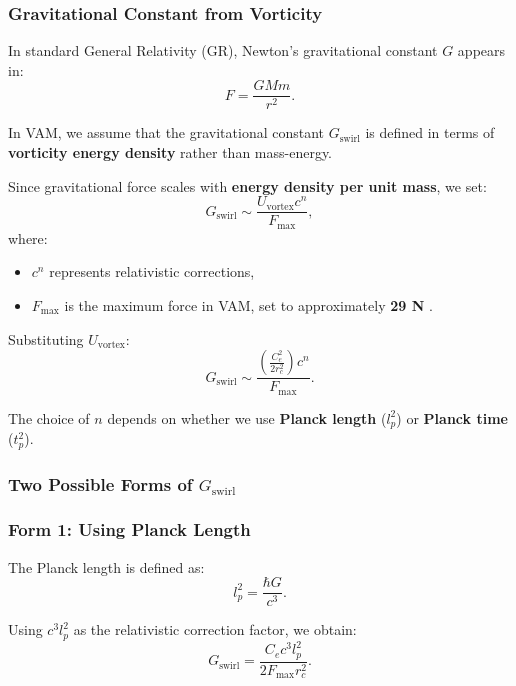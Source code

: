 \subsubsection*{Gravitational Constant from Vorticity}
In standard General Relativity (GR), Newton’s gravitational constant \( G \) appears in:
\begin{equation*}
    F = \frac{GMm}{r^2}.
\end{equation*}

In VAM, we assume that the gravitational constant \(  G_\text{swirl} \) is defined in terms of \textbf{vorticity energy density} rather than mass-energy.

Since gravitational force scales with \textbf{energy density per unit mass}, we set:
\begin{equation*}
     G_\text{swirl} \sim \frac{U_{\text{vortex}} c^n}{F_{\max}},
\end{equation*}
where:
\begin{itemize}
    \item \( c^n \) represents relativistic corrections,
    \item \( F_{\max} \) is the maximum force in VAM, set to approximately \textbf{29 N} \cite{schiller_max_force}.
\end{itemize}

Substituting \( U_{\text{vortex}} \):
\begin{equation*}
     G_\text{swirl} \sim \frac{\left( \frac{C_e^2}{2 r_c^2} \right) c^n}{F_{\max}}.
\end{equation*}

The choice of \( n \) depends on whether we use \textbf{Planck length} (\( l_p^2 \)) or \textbf{Planck time} (\( t_p^2 \)).

\subsubsection*{Two Possible Forms of \(  G_\text{swirl} \)}
\subsubsection*{Form 1: Using Planck Length}
The Planck length is defined as:
\begin{equation*}
    l_p^2 = \frac{\hbar G}{c^3}.
\end{equation*}

Using \( c^3 l_p^2 \) as the relativistic correction factor, we obtain:
\begin{equation*}
     G_\text{swirl} = \frac{C_e c^3 l_p^2}{2 F_{\max} r_c^2}.
\end{equation*}

